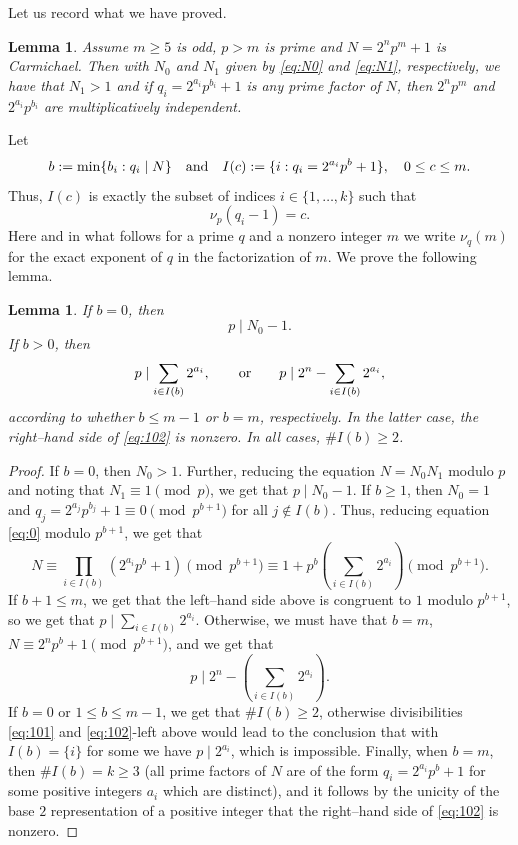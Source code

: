\documentclass[11pt]{article}
\newtheorem{lemma}[lem]{Lemma}
\begin{document}
Let us record what we have proved.

\begin{lemma}
Assume $m\ge 5$ is odd, $p>m$ is prime and $N=2^np^m+1$ is Carmichael. Then with $N_0$ and $N_1$ given by \eqref{eq:N0} and \eqref{eq:N1}, respectively, we have that $N_1>1$ and if $q_i=2^{a_i}p^{b_i}+1$ is any prime factor of $N$, then 
$2^np^m$ and $2^{a_i}p^{b_i}$ are multiplicatively independent. 
\end{lemma}
Let 
$$b:=\min\{b_i: q_i\mid N\}\quad {\text{\rm and}}\quad {I}(c):=\{i: q_i=2^{a_i}p^b+1\},\quad 0\le c\le m.
$$ 
Thus, $I(c)$ is exactly the subset of indices $i\in \{1,\ldots,k\}$ such that 
$$
\nu_{p}(q_i-1)=c.
$$ 
Here and in what follows for a prime $q$ and a nonzero integer $m$ we write $\nu_q(m)$ for the exact exponent of $q$ in the factorization of $m$. 
We prove the following lemma.

\begin{lemma}
\label{lem:10}
If $b=0$, then 
\begin{equation}
\label{eq:101}
p\mid N_0-1. 
\end{equation}
If $b>0$, then 
\begin{equation}
\label{eq:102}
p\mid \sum_{i\in I(b)} 2^{a_i},\qquad {\text{\rm or}}\qquad p\mid 2^n-\sum_{i\in I(b)} 2^{a_i},
\end{equation}
according to whether $b\le m-1$ or $b=m$, respectively.  In the latter case, the right--hand side of \eqref{eq:102} is nonzero. 
In all cases, $\#I(b)\ge 2$.
\end{lemma}

\begin{proof}
If $b=0$, then $N_0>1$. Further, reducing the equation $N=N_0N_1$ modulo $p$ and noting that $N_1\equiv 1\pmod p$, we get that $p\mid N_0-1$. If $b\ge 1$, then $N_0=1$ and $q_j=2^{a_j}p^{b_j}+1\equiv 0\pmod {p^{b+1}}$ 
for all $j\not\in I(b)$. Thus, reducing equation \eqref{eq:0} modulo $p^{b+1}$, we get that 
$$
N\equiv \prod_{i\in I(b)} (2^{a_i}p^{b}+1)\pmod {p^{b+1}}\equiv 1+p^b(\sum_{i\in I(b)} 2^{a_i})\pmod {p^{b+1}}.
$$
If $b+1\le m$, we get that the left--hand side above is congruent to $1$ modulo $p^{b+1}$, so we get that $p\mid \sum_{i\in I(b)} 2^{a_i}$. Otherwise, we must have that $b=m$, $N\equiv 2^np^b+1\pmod {p^{b+1}}$, and we get that 
$$
p\mid 2^n-(\sum_{i\in I(b)} 2^{a_i}).
$$
If $b=0$ or $1\le b\le m-1$, we get that $\#I(b)\ge 2$, otherwise divisibilities \eqref{eq:101} and \eqref{eq:102}-left above would lead to the conclusion that with $I(b)=\{i\}$ for some we have $p\mid 2^{a_i}$, which is impossible. 
Finally, when $b=m$, then $\#I(b)=k\ge 3$ (all prime factors of $N$ are of the form $q_i=2^{a_i}p^b+1$ for some positive integers $a_i$ which are distinct), and it follows by the unicity of the base $2$ representation of a positive integer that the right--hand side of \eqref{eq:102} is nonzero. 
\end{proof}
\end{document}
